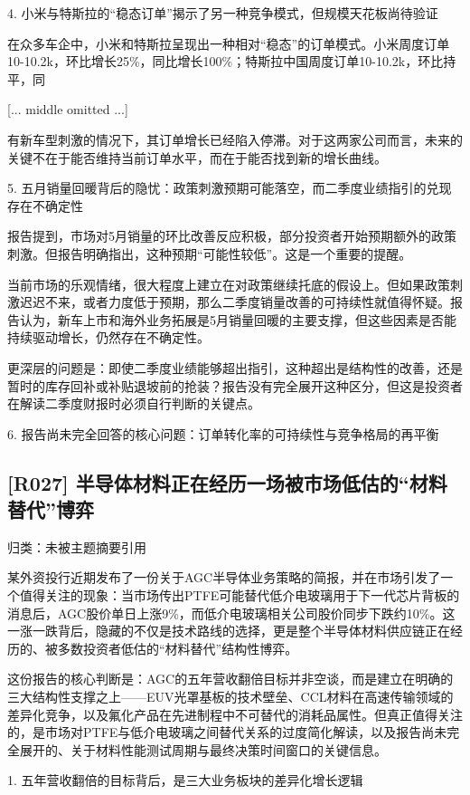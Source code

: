 \documentclass[11pt]{ctexart}
\begin{document}
4. 小米与特斯拉的“稳态订单”揭示了另一种竞争模式，但规模天花板尚待验证

在众多车企中，小米和特斯拉呈现出一种相对“稳态”的订单模式。小米周度订单10-10.2k，环比增长25\%，同比增长100\%；特斯拉中国周度订单10-10.2k，环比持平，同

[... middle omitted ...]

有新车型刺激的情况下，其订单增长已经陷入停滞。对于这两家公司而言，未来的关键不在于能否维持当前订单水平，而在于能否找到新的增长曲线。

5. 五月销量回暖背后的隐忧：政策刺激预期可能落空，而二季度业绩指引的兑现存在不确定性

报告提到，市场对5月销量的环比改善反应积极，部分投资者开始预期额外的政策刺激。但报告明确指出，这种预期“可能性较低”。这是一个重要的提醒。

当前市场的乐观情绪，很大程度上建立在对政策继续托底的假设上。但如果政策刺激迟迟不来，或者力度低于预期，那么二季度销量改善的可持续性就值得怀疑。报告认为，新车上市和海外业务拓展是5月销量回暖的主要支撑，但这些因素是否能持续驱动增长，仍然存在不确定性。

更深层的问题是：即使二季度业绩能够超出指引，这种超出是结构性的改善，还是暂时的库存回补或补贴退坡前的抢装？报告没有完全展开这种区分，但这是投资者在解读二季度财报时必须自行判断的关键点。

6. 报告尚未完全回答的核心问题：订单转化率的可持续性与竞争格局的再平衡

\subsection{[R027] 半导体材料正在经历一场被市场低估的“材料替代”博弈}
{\small\color{refgray}归类：未被主题摘要引用}

某外资投行近期发布了一份关于AGC半导体业务策略的简报，并在市场引发了一个值得关注的现象：当市场传出PTFE可能替代低介电玻璃用于下一代芯片背板的消息后，AGC股价单日上涨9\%，而低介电玻璃相关公司股价同步下跌约10\%。这一涨一跌背后，隐藏的不仅是技术路线的选择，更是整个半导体材料供应链正在经历的、被多数投资者低估的“材料替代”结构性博弈。

这份报告的核心判断是：AGC的五年营收翻倍目标并非空谈，而是建立在明确的三大结构性支撑之上——EUV光罩基板的技术壁垒、CCL材料在高速传输领域的差异化竞争，以及氟化产品在先进制程中不可替代的消耗品属性。但真正值得关注的，是市场对PTFE与低介电玻璃之间替代关系的过度简化解读，以及报告尚未完全展开的、关于材料性能测试周期与最终决策时间窗口的关键信息。

1. 五年营收翻倍的目标背后，是三大业务板块的差异化增长逻辑
\end{document}
